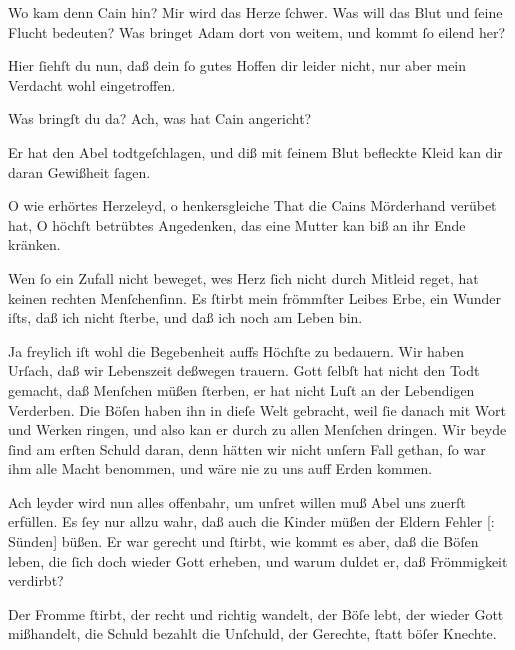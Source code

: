\documentclass[tocstyle=ref-genre]{ees}
\begin{document}
{\begin{movement}{}
  \voice[Eva]
  Wo kam denn Cain hin? Mir wird das Herze ſchwer.
  Was will das Blut und ſeine Flucht bedeuten?
  Was bringet Adam dort von weitem,
  und kommt ſo eilend her?

  \voice[Adam]
  Hier ſiehſt du nun, daß dein ſo gutes Hoffen
  dir leider nicht,
  nur aber mein Verdacht wohl eingetroffen.

  \voice[Eva]
  Was bringſt du da? Ach, was hat Cain angericht?

  \voice[Adam]
  Er hat den Abel todtgeſchlagen,
  und diß mit ſeinem Blut befleckte Kleid
  kan dir daran Gewißheit ſagen.

  \voice[Eva]
  O wie erhörtes Herzeleyd,
  o henkersgleiche That
  die Cains Mörderhand verübet hat,
  O höchſt betrübtes Angedenken,
  das eine Mutter kan biß an ihr Ende kränken.
\end{movement}

\begin{movement}{}
  \voice[Eva]
  Wen ſo ein Zufall nicht beweget,
  wes Herz ſich nicht durch Mitleid reget,
  hat keinen rechten Menſchenſinn.
  Es ſtirbt mein frömmſter Leibes Erbe,
  ein Wunder iſts, daß ich nicht ſterbe,
  und daß ich noch am Leben bin.
\end{movement}

\begin{movement}{}
  \voice[Adam]
  Ja freylich iſt wohl die Begebenheit
  auffs Höchſte zu bedauern.
  Wir haben Urſach, daß wir Lebenszeit
  deßwegen trauern.
  Gott ſelbſt hat nicht den Todt gemacht,
  daß Menſchen müßen ſterben,
  er hat nicht Luſt
  an der Lebendigen Verderben.
  Die Böſen haben ihn in dieſe Welt gebracht,
  weil ſie danach mit Wort und Werken ringen,
  und also kan er durch zu allen Menſchen dringen.
  Wir beyde ſind am erſten Schuld daran,
  denn hätten wir nicht unſern Fall gethan,
  ſo war ihm alle Macht benommen,
  und wäre nie zu uns auff Erden kommen.

  \voice[Eva]
  Ach leyder wird nun alles offenbahr,
  um unſret willen
  muß Abel uns zuerſt erfüllen.
  Es ſey nur allzu wahr,
  daß auch die Kinder müßen
  der Eldern Fehler [: Sünden] büßen.
  Er war gerecht und ſtirbt,
  wie kommt es aber, daß die Böſen leben,
  die ſich doch wieder Gott erheben,
  und warum duldet er, daß Frömmigkeit verdirbt?
\end{movement}

\begin{movement}{}
  \voice[Chor]
  Der Fromme ſtirbt, der recht und richtig wandelt,
  der Böſe lebt, der wieder Gott mißhandelt,
  die Schuld bezahlt die Unſchuld, der Gerechte,
  ſtatt böſer Knechte.
\end{movement}

}
\end{document}
